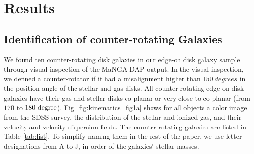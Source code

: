 \documentclass[fleqn,usenatbib]{mnras}
\begin{document}
\section{Results} \label{sec:result}
\subsection{Identification of counter-rotating Galaxies} \label{sec:crgal}

We found ten counter-rotating disk galaxies in our edge-on disk galaxy sample 
through visual inspection of the MaNGA DAP output. 
In the visual inspection, we defined a counter-rotator if it had a misalignment 
higher than $150~degrees$ in the position angle of the stellar and gas disks. 
All counter-rotating edge-on disk galaxies have their gas and stellar disks co-planar or very close to co-planar (from $170$ to $\rm 180~degree$).
Fig~\ref{fig:kinematics_fig1a} 
shows for all objects a color image from the SDSS survey, 
the distribution of the stellar and ionized gas, and 
their velocity and velocity dispersion fields.
The counter-rotating galaxies are listed in Table \ref{tab:list}. 
To simplify naming them in the rest of the paper, we use letter designations from A to J, 
in order of the galaxies' stellar masses.
\end{document}
